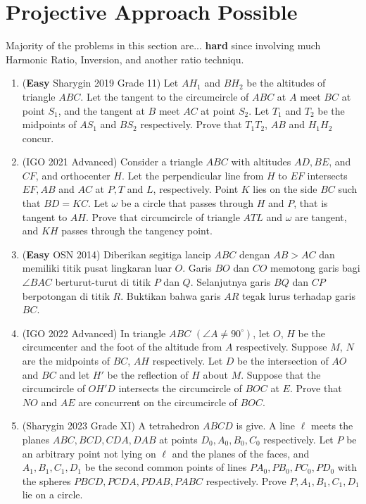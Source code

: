 \documentclass[12pt]{scrartcl}
\begin{document}
\section{Projective Approach Possible}
Majority of the problems in this section are... \textbf{hard} since involving much Harmonic Ratio, Inversion, and another ratio techniqu.
\begin{enumerate}
    \item (\textbf{Easy} Sharygin 2019 Grade 11) Let $AH_1$ and $BH_2$ be the altitudes of triangle $ABC$. Let the tangent to the circumcircle of $ABC$ at $A$ meet $BC$ at point $S_1$, and the tangent at $B$ meet $AC$ at point $S_2$. Let $T_1$ and $T_2$ be the midpoints of $AS_1$ and $BS_2$ respectively. Prove that $T_1T_2$, $AB$ and $H_1H_2$ concur.
    
    \item (IGO 2021 Advanced) Consider a triangle $ABC$ with altitudes $AD, BE$, and $CF$, and orthocenter $H$. Let the perpendicular line from $H$ to $EF$ intersects $EF, AB$ and $AC$ at $P, T$ and $L$, respectively. Point $K$ lies on the side $BC$ such that $BD=KC$. Let $\omega$ be a circle that passes through $H$ and $P$, that is tangent to $AH$. Prove that circumcircle of triangle $ATL$ and $\omega$ are tangent, and $KH$ passes through the tangency point.

    \item (\textbf{Easy} OSN 2014) Diberikan segitiga lancip $ABC$ dengan $AB > AC$ dan memiliki titik pusat lingkaran luar $O$. Garis $BO$ dan $CO$ memotong garis bagi $\angle BAC$ berturut-turut di titik $P$ dan $Q$. Selanjutnya garis $BQ$ dan $CP$ berpotongan di titik $R$. Buktikan bahwa garis $AR$ tegak lurus terhadap garis $BC$.

    \item (IGO 2022 Advanced) In triangle $ABC$ $(\angle A\neq 90^\circ)$, let $O$, $H$ be the circumcenter and the foot of the altitude from $A$ respectively. Suppose $M$, $N$ are the midpoints of $BC$, $AH$ respectively. Let $D$ be the intersection of $AO$ and $BC$ and let $H'$ be the reflection of $H$ about $M$. Suppose that the circumcircle of $OH'D$ intersects the circumcircle of $BOC$ at $E$. Prove that $NO$ and $AE$ are concurrent on the circumcircle of $BOC$.

    \item (Sharygin 2023 Grade XI) A tetrahedron $ABCD$ is give. A line $\ell$ meets the planes $ABC,BCD,CDA,DAB$ at points $D_0,A_0,B_0,C_0$ respectively. Let $P$ be an arbitrary point not lying on $\ell$ and the planes of the faces, and $A_1,B_1,C_1,D_1$ be the second common points of lines $PA_0,PB_0,PC_0,PD_0$ with the spheres $PBCD,PCDA,PDAB,PABC$ respectively. Prove $P,A_1,B_1,C_1,D_1$ lie on a circle.
\end{enumerate}
\end{document}

